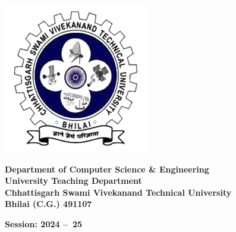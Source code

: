 \begin{titlepage}
    \vspace{0.3cm}

    \noindent\makebox[\linewidth]{\rule{\textwidth}{0.4pt}}
    \begin{minipage}{0.17\textwidth}
      \centering
      \includegraphics[width=\textwidth]{images/logo.png}
    \end{minipage}
    \hfil
    \begin{minipage}{0.7\textwidth}
      \centering
      \textbf{Department of Computer Science \& Engineering}\\
      \textbf{University Teaching Department}\\
      \textbf{Chhattisgarh Swami Vivekanand Technical University}\\
      \textbf{Bhilai (C.G.) 491107}
    \end{minipage}
    \noindent\makebox[\linewidth]{\rule{\textwidth}{0.4pt}}
    \textbf{Session: 2024 --\ 25}
    \noindent\makebox[\linewidth]{\rule{\textwidth}{0.4pt}} 
    
  
  \end{titlepage} 
\restoregeometry %